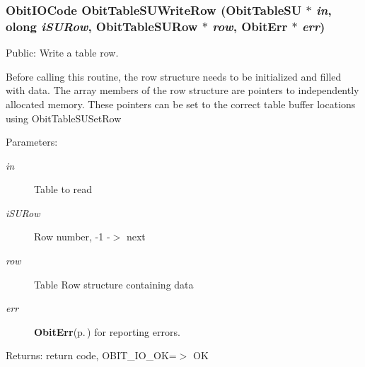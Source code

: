 \subsubsection{\setlength{\rightskip}{0pt plus 5cm}Obit\-IOCode Obit\-Table\-SUWrite\-Row ({\bf Obit\-Table\-SU} $\ast$ {\em in}, {\bf olong} {\em i\-SURow}, {\bf Obit\-Table\-SURow} $\ast$ {\em row}, {\bf Obit\-Err} $\ast$ {\em err})}\label{ObitTableSU_8c_a24}


Public: Write a table row. 

Before calling this routine, the row structure needs to be initialized and filled with data. The array members of the row structure are pointers to independently allocated memory. These pointers can be set to the correct table buffer locations using Obit\-Table\-SUSet\-Row \begin{Desc}
\item[Parameters:]
\begin{description}
\item[{\em in}]Table to read \item[{\em i\-SURow}]Row number, -1 -$>$ next \item[{\em row}]Table Row structure containing data \item[{\em err}]{\bf Obit\-Err}{\rm (p.\,\pageref{structObitErr})} for reporting errors. \end{description}
\end{Desc}
\begin{Desc}
\item[Returns:]return code, OBIT\_\-IO\_\-OK=$>$ OK \end{Desc}
